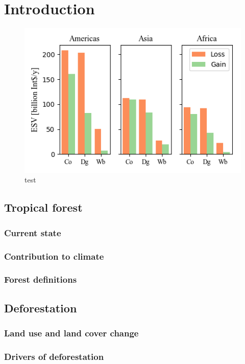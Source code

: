 \section{Introduction}
\label{sec:introduction}

\begin{figure}
	\centering
	\includegraphics[scale=1]{img/esv}
	\caption[list titel]{test}
	\label{fig:test}
\end{figure}

\subsection{Tropical forest}
\subsubsection{Current state}
\subsubsection{Contribution to climate}
\subsubsection{Forest definitions}
\subsection{Deforestation}
\subsubsection{Land use and land cover change}
\subsubsection{Drivers of deforestation}
